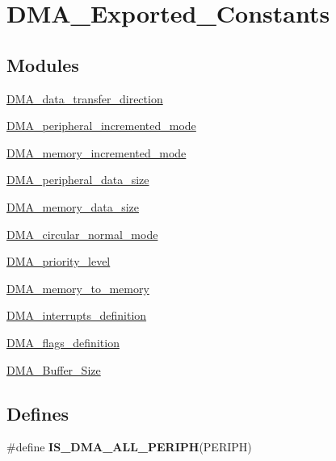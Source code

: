 \hypertarget{group__DMA__Exported__Constants}{
\section{DMA\_\-Exported\_\-Constants}
\label{group__DMA__Exported__Constants}
}
\subsection*{Modules}
\begin{DoxyCompactItemize}
\item 
\hyperlink{group__DMA__data__transfer__direction}{DMA\_\-data\_\-transfer\_\-direction}
\item 
\hyperlink{group__DMA__peripheral__incremented__mode}{DMA\_\-peripheral\_\-incremented\_\-mode}
\item 
\hyperlink{group__DMA__memory__incremented__mode}{DMA\_\-memory\_\-incremented\_\-mode}
\item 
\hyperlink{group__DMA__peripheral__data__size}{DMA\_\-peripheral\_\-data\_\-size}
\item 
\hyperlink{group__DMA__memory__data__size}{DMA\_\-memory\_\-data\_\-size}
\item 
\hyperlink{group__DMA__circular__normal__mode}{DMA\_\-circular\_\-normal\_\-mode}
\item 
\hyperlink{group__DMA__priority__level}{DMA\_\-priority\_\-level}
\item 
\hyperlink{group__DMA__memory__to__memory}{DMA\_\-memory\_\-to\_\-memory}
\item 
\hyperlink{group__DMA__interrupts__definition}{DMA\_\-interrupts\_\-definition}
\item 
\hyperlink{group__DMA__flags__definition}{DMA\_\-flags\_\-definition}
\item 
\hyperlink{group__DMA__Buffer__Size}{DMA\_\-Buffer\_\-Size}
\end{DoxyCompactItemize}
\subsection*{Defines}
\begin{DoxyCompactItemize}
\item 
\#define {\bfseries IS\_\-DMA\_\-ALL\_\-PERIPH}(PERIPH)
\end{DoxyCompactItemize}


